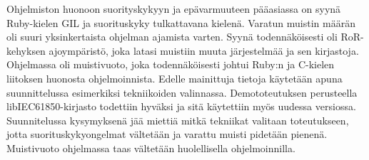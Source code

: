 Ohjelmiston huonoon suorityskykyyn ja epävarmuuteen pääasiassa on syynä Ruby-kielen GIL ja suorituskyky tulkattavana kielenä. Varatun muistin määrän oli suuri yksinkertaista ohjelman ajamista varten. Syynä todennäköisesti oli RoR-kehyksen ajoympäristö, joka latasi muistiin muuta järjestelmää ja sen kirjastoja. Ohjelmassa oli muistivuoto, joka todennäköisesti johtui Ruby:n ja C-kielen liitoksen huonosta ohjelmoinnista. Edelle mainittuja tietoja käytetään apuna suunnittelussa esimerkiksi tekniikoiden valinnassa. Demototeutuksen perusteella libIEC61850-kirjasto todettiin hyväksi ja sitä käytettiin myös uudessa versiossa. Suunnitelussa kysymyksenä jää miettiä mitkä tekniikat valitaan toteutukseen, jotta suorituskykyongelmat vältetään ja varattu muisti pidetään pienenä. Muistivuoto ohjelmassa taas vältetään huolellisella ohjelmoinnilla.